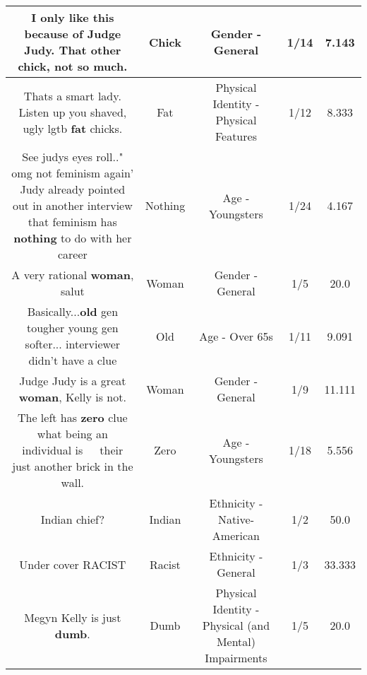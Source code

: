 \documentclass[11pt]{article}
\newlength\mylength
\begin{document}
\begin{center}
\begin{longtable}{|C{.65\mylength}|C{.30\mylength}|C{.12\mylength}|C{.12\mylength}|C{.12\mylength}|}
  \small I only like this because of Judge Judy.  That other \textbf{chick}, not so much.\normalsize   & Chick & Gender - General & 1/14 & 7.143 \\  \hline
  \small Thats a smart lady. Listen up you shaved, ugly lgtb \textbf{fat} chicks.\normalsize   & Fat & Physical Identity - Physical Features & 1/12 & 8.333 \\  \hline
  \small See judys eyes roll.." omg not feminism again'  Judy already pointed out in another interview that feminism has \textbf{nothing} to do with her career\normalsize   & Nothing & Age - Youngsters & 1/24 & 4.167 \\  \hline
  \small A very rational \textbf{woman}, salut\normalsize   & Woman & Gender - General & 1/5 & 20.0 \\  \hline
  \small Basically...\textbf{old} gen tougher young gen softer... interviewer didn't have a clue\normalsize   & Old & Age - Over 65s & 1/11 & 9.091 \\  \hline
  \small Judge Judy is a great \textbf{woman}, Kelly is not.\normalsize   & Woman & Gender - General & 1/9 & 11.111 \\  \hline
  \small The left has \textbf{zero} clue what being an individual is 🤷🏽‍♂️ their just another brick in the wall.\normalsize   & Zero & Age - Youngsters & 1/18 & 5.556 \\  \hline
  \small Indian chief?\normalsize   & Indian & Ethnicity - Native-American & 1/2 & 50.0 \\  \hline
  \small Under cover RACIST\normalsize   & Racist & Ethnicity - General & 1/3 & 33.333 \\  \hline
  \small Megyn Kelly is just \textbf{dumb}.\normalsize   & Dumb & Physical Identity - Physical (and Mental) Impairments & 1/5 & 20.0 \\  \hline

\end{longtable}
\end{center}
\end{document}
